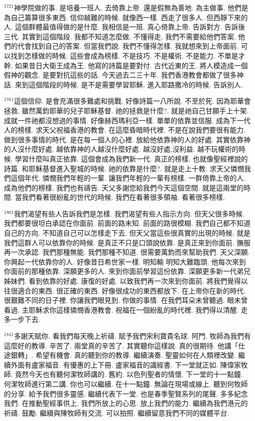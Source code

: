 \documentclass{book}
\begin{document}
$^{1721}$神學院做的事.
是培養一班人.
去倚靠上帝.
還是假無為善地.
為主做事.
他們是為自己籌算很多東西.
信仰越難的時候.
就像西一樣.
西走了很多人.
但西靜下來的人.
這個群體最值得做的是什麼.
我相信是一班.
真心倚靠上帝.
告訴對方.
告訴後三代.
其實到這個階段.
我都不知道怎麼做.
不懂得走.
我們不需要給他們答案.
他們的代會找到自己的答案.
但當我們說.
我們不懂得怎樣.
我就想來到上帝面前.
可以找到怎樣做的時候.
這些會成為榜樣.
不是技巧.
不是權術.
不是能力.
不單是才幹.
如果昔日大衛王成為王.
他寫的詩篇是要對付.
古代近東的王.
將人模造成一個假神的觀念.
是要對抗這些的話.
今天過去二三十年.
我們香港教會都做了很多神話.
來到這個階段的時候.
是不是需要學習耶穌.
進入耶路撒冷的時候.
告訴別人.

$^{1761}$這個信仰.
是會充滿很多難處和挑戰.
好像詩篇一八所說.
不至於死.
因為耶華會拯救.
雖然萬鈞耶華的兒子耶穌基督.
祂的拯救是什麼?.
就是祂自己甘願手上十架.
成就一件祂都沒想過的事情.
好像赫西瑪利亞一樣.
單單的依靠並信服.
成為下一代人的榜樣.
求天父祝福香港的教會.
在這麼昏暗時代裡.
不是在說我們要很有能力.
做到很多事情的時代.
是在每一個人的心裡.
放給他依靠神的人的好處.
其實依靠神的人沒什麼好處.
越依靠神的人越沒什麼好處.
越沒好處,沒利益.
越不玩權術的時候.
學習什麼叫真正依靠.
這個會成為我們新一代.
真正的榜樣.
也就像聖經裡說的詩篇.
和耶穌基督進入聖城的時候.
祂的依靠是什麼?.
就是走上十教.
求天父憐憫我們這個年代.
憐憫我們年輕的一輩.
讓我們年輕的一輩有榜樣.
一群倚靠上帝的人.
成為他們的榜樣.
我們也有禱告.
天父多謝您給我們今天這個空間.
就是這兩堂的時間.
當我們看著很紛亂的世代的時候.
我們在看著很多領袖.
看著很多榜樣.

$^{1801}$我們渴望有些人告訴我們是怎樣.
我們渴望有些人指示方向.
但天父很多時候.
我們都要很坦白承認在你面前.
前面的路未知.
前面的路很模糊.
我們自己都不知道自己的方向.
不知道自己可以怎樣走下去.
但天父當這些很真實的出現的時候.
就是我們這群人可以依靠你的時候.
是真正不只是口頭說依靠.
是真正來到你面前.
撫服再一次承認.
我們那種無能.
我們那種不知道.
很需要萬鈞而來幫助我們.
天父深願.
你興起一代依靠你的人.
好像昔日希世家一樣.
明知輸 明知大難臨頭.
他每次來到你面前的那種依靠.
深願更多的人.
來到你面前學習這份依靠.
深願更多新一代弟兄姊妹們.
看到依靠的好處.
康復的好處.
以致我們再一次來到你面前.
將我們覺得以往很適合的東西.
很正確的東西.
好像很成功的東西都放下.
在上帝你在新的時代.
很艱難不同的日子裡.
你讓我們眼見到.
你做的事情.
在我們耳朵未曾聽過.
眼未曾看過.
主耶穌求你這樣憐憫香港教會.
祝福在一個紛亂的時代裡.
我們得以清醒.
走多一步下去.

$^{1841}$多謝天賦你.
看我們每天晚上祈禱.
賦予我們宋利寶貴名球.
阿門.
 牧師為我們有這麼好的教導.
辛苦了.
兩堂真的辛苦了.
其實聽你這樣說.
真的很期待.
他講「仕途銀轉」.
希望有機會.
真的聽到你的教導.
繼續演奏.
聖靈如何在人類裡改變.
繼續外面有盧家福音.
有優惠的上下冊.
盧家福音的識經書.
下一堂就正如.
陳偉家牧師.
竟然今天也有聽何潔牧師講的.
舊約.
以色列聖者的情懷.
下一堂的十一點鐘.
何潔牧師進行第二講.
你也可以繼續.
在十一點鐘.
無論在現場或線上.
聽到何牧師的分享.
給予我們很多靈感.
繼續代表下一堂.
也是春季聖賢系列的尾聲.
多多紀念我們.
在推動聖經事供上.
我們所放上的心思.
放上我們的能力.
繼續為我們港元的祈禱.
鼓勵.
繼續與陳牧師有交流.
可以拍照.
繼續留意我們不同的媒體平台.
\end{document}
